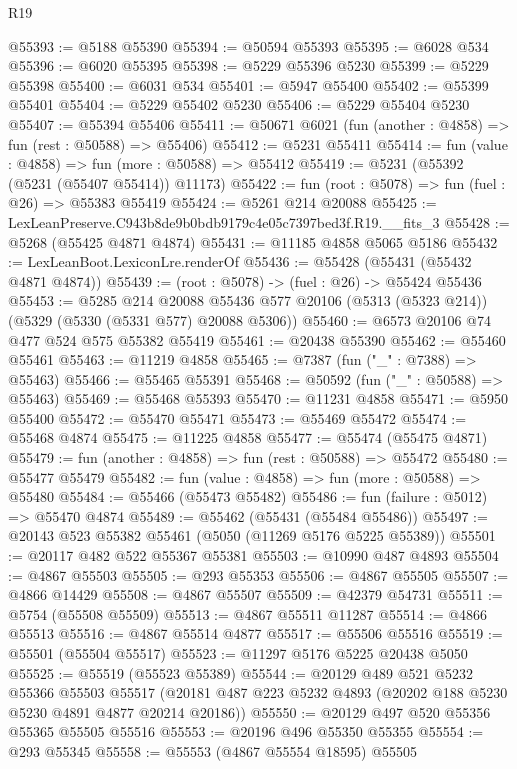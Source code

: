 \begin{lexlean}{R19}
\begin{coremodule}
@55393 := @5188 @55390
@55394 := @50594 @55393
@55395 := @6028 @534
@55396 := @6020 @55395
@55398 := @5229 @55396 @5230
@55399 := @5229 @55398
@55400 := @6031 @534
@55401 := @5947 @55400
@55402 := @55399 @55401
@55404 := @5229 @55402 @5230
@55406 := @5229 @55404 @5230
@55407 := @55394 @55406
@55411 := @50671 @6021 (fun (another : @4858) => fun (rest : @50588) => @55406)
@55412 := @5231 @55411
@55414 := fun (value : @4858) => fun (more : @50588) => @55412
@55419 := @5231 (@55392 (@5231 (@55407 @55414)) @11173)
@55422 := fun (root : @5078) => fun (fuel : @26) => @55383 @55419
@55424 := @5261 @214 @20088
@55425 := LexLeanPreserve.C943b8de9b0bdb9179c4e05c7397bed3f.R19.__fits_3
@55428 := @5268 (@55425 @4871 @4874)
@55431 := @11185 @4858 @5065 @5186
@55432 := LexLeanBoot.LexiconLre.renderOf
@55436 := @55428 (@55431 (@55432 @4871 @4874))
@55439 := (root : @5078) -> (fuel : @26) -> @55424 @55436
@55453 := @5285
    @214
    @20088
    @55436
    @577
    @20106
    (@5313 (@5323 @214))
    (@5329 (@5330 (@5331 @577) @20088 @5306))
@55460 := @6573 @20106 @74 @477 @524 @575 @55382 @55419
@55461 := @20438 @55390
@55462 := @55460 @55461
@55463 := @11219 @4858
@55465 := @7387 (fun ("_" : @7388) => @55463)
@55466 := @55465 @55391
@55468 := @50592 (fun ("_" : @50588) => @55463)
@55469 := @55468 @55393
@55470 := @11231 @4858
@55471 := @5950 @55400
@55472 := @55470 @55471
@55473 := @55469 @55472
@55474 := @55468 @4874
@55475 := @11225 @4858
@55477 := @55474 (@55475 @4871)
@55479 := fun (another : @4858) => fun (rest : @50588) => @55472
@55480 := @55477 @55479
@55482 := fun (value : @4858) => fun (more : @50588) => @55480
@55484 := @55466 (@55473 @55482)
@55486 := fun (failure : @5012) => @55470 @4874
@55489 := @55462 (@55431 (@55484 @55486))
@55497 := @20143 @523 @55382 @55461 (@5050 (@11269 @5176 @5225 @55389))
@55501 := @20117 @482 @522 @55367 @55381
@55503 := @10990 @487 @4893
@55504 := @4867 @55503
@55505 := @293 @55353
@55506 := @4867 @55505
@55507 := @4866 @14429
@55508 := @4867 @55507
@55509 := @42379 @54731
@55511 := @5754 (@55508 @55509)
@55513 := @4867 @55511 @11287
@55514 := @4866 @55513
@55516 := @4867 @55514 @4877
@55517 := @55506 @55516
@55519 := @55501 (@55504 @55517)
@55523 := @11297 @5176 @5225 @20438 @5050
@55525 := @55519 (@55523 @55389)
@55544 := @20129
    @489
    @521
    @5232
    @55366
    @55503
    @55517
    (@20181 @487 @223 @5232 @4893 (@20202 @188 @5230 @5230 @4891 @4877 @20214 @20186))
@55550 := @20129 @497 @520 @55356 @55365 @55505 @55516
@55553 := @20196 @496 @55350 @55355
@55554 := @293 @55345
@55558 := @55553 (@4867 @55554 @18595) @55505

\end{coremodule}
\end{lexlean}

